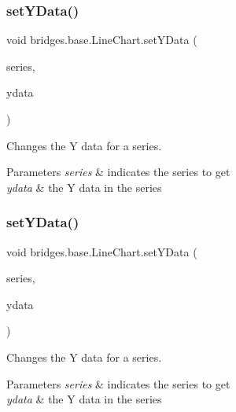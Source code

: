 \subsubsection{\texorpdfstring{set\+Y\+Data()}{setYData()}\hspace{0.1cm}{\footnotesize\ttfamily [1/2]}}
{\footnotesize\ttfamily void bridges.\+base.\+Line\+Chart.\+set\+Y\+Data (\begin{DoxyParamCaption}\item[{String}]{series,  }\item[{Array\+List$<$ Double $>$}]{ydata }\end{DoxyParamCaption})}



Changes the Y data for a series. 


\begin{DoxyParams}{Parameters}
{\em series} & indicates the series to get \\
\hline
{\em ydata} & the Y data in the series \\
\hline
\end{DoxyParams}
\mbox{\label{classbridges_1_1base_1_1_line_chart_aa8094fad197ae35d93f9feab5de91f59}} 
\subsubsection{\texorpdfstring{set\+Y\+Data()}{setYData()}\hspace{0.1cm}{\footnotesize\ttfamily [2/2]}}
{\footnotesize\ttfamily void bridges.\+base.\+Line\+Chart.\+set\+Y\+Data (\begin{DoxyParamCaption}\item[{String}]{series,  }\item[{double \mbox{[}$\,$\mbox{]}}]{ydata }\end{DoxyParamCaption})}



Changes the Y data for a series. 


\begin{DoxyParams}{Parameters}
{\em series} & indicates the series to get \\
\hline
{\em ydata} & the Y data in the series \\
\hline
\end{DoxyParams}
\mbox{\label{classbridges_1_1base_1_1_line_chart_adddccbe77ebd2590f426fab9c8227457}} 
